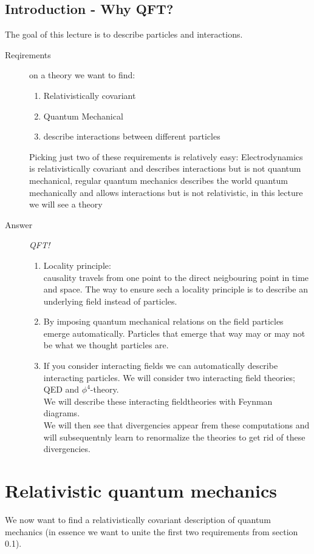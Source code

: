 \documentclass{report}
\begin{document}
\section*{Introduction - Why QFT?}
The goal of this lecture is to describe particles and interactions. 
\begin{description}
  \item[Reqirements] on a theory we want to find:
    \begin{enumerate}
      \item Relativistically covariant
      \item Quantum Mechanical
      \item describe interactions between different particles
    \end{enumerate}
  Picking just two of these requirements is relatively easy: Electrodynamics is relativistically covariant and describes interactions but is not quantum mechanical, regular quantum mechanics describes the world quantum mechanically and allows interactions but is not relativistic, in this lecture we will see a theory
  \item[Answer] \emph{QFT!} 
    \begin{enumerate}
      \item Locality principle: \\
        causality travels from one point to the direct neigbouring point in time and space. The way to ensure sech a locality principle is to describe an underlying field instead of particles.
      \item By imposing quantum mechanical relations on the field particles emerge automatically. Particles that emerge that way may or may not be what we thought particles are.
      \item If you consider interacting fields we can automatically describe interacting particles. We will consider two interacting field theories; QED and $\phi^4$-theory.\\
        We will describe these interacting fieldtheories with Feynman diagrams.\\
        We will then see that divergencies appear frem these computations and will subsequentnly learn to renormalize the theories to get rid of these divergencies.
    \end{enumerate}
\end{description}
\tableofcontents

\newpage
{}
\chapter{Relativistic quantum mechanics}
We now want to find a relativistically covariant description of quantum mechanics (in essence we want to unite the first two requirements from section 0.1).
\end{document}
